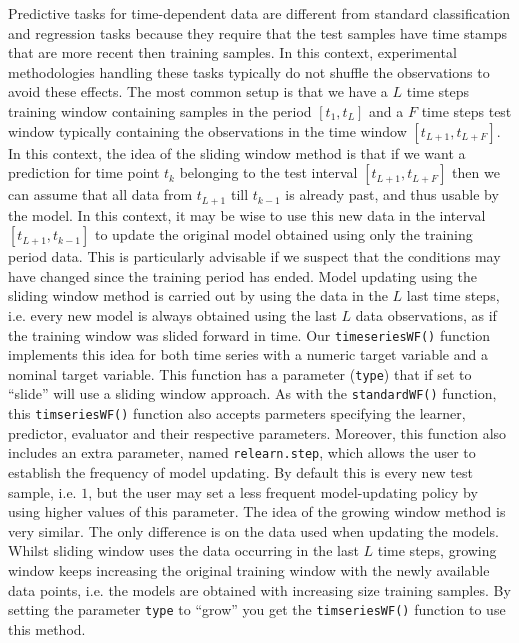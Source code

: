\documentclass[10pt,a4paper]{article}\usepackage[]{graphicx}\usepackage[]{color}
\begin{document}
Predictive tasks for time-dependent data are different from standard
classification and regression tasks because they require that the test
samples have time stamps that are more recent then training
samples. In this context, experimental methodologies handling these
tasks typically do not shuffle the observations to avoid these
effects. The most common setup is that we have a $L$ time steps
training window containing samples in the period $[t_1,t_L]$ and a $F$
time steps test window typically containing the observations in the
time window $[t_{L+1},t_{L+F}]$. In this context, the idea of the
sliding window method is that if we want a prediction for time point
$t_k$ belonging to the test interval $[t_{L+1},t_{L+F}]$ then we can
assume that all data from $t_{L+1}$ till $t_{k-1}$ is already past,
and thus usable by the model. In this context, it may be wise to use
this new data in the interval $[t_{L+1},t_{k-1}]$ to update the
original model obtained using only the training period data. This is
particularly advisable if we suspect that the conditions may have
changed since the training period has ended. Model updating using the
sliding window method is carried out by using the data in the $L$ last
time steps, i.e. every new model is always obtained using the last $L$
data observations, as if the training window was slided forward in
time. Our \texttt{timeseriesWF()} function implements this idea for
both time series with a numeric target variable and a nominal target
variable. This function has a parameter (\texttt{type}) that if set to
``slide'' will use a sliding window approach. As with the
\texttt{standardWF()} function, this \texttt{timseriesWF()} function
also accepts parmeters specifying the learner, predictor, evaluator
and their respective parameters. Moreover, this function also includes
an extra parameter, named \texttt{relearn.step}, which allows the user
to establish the frequency of model updating. By default this is every
new test sample, i.e. $1$, but the user may set a less frequent
model-updating policy by using higher values of this parameter.  The
idea of the growing window method is very similar. The only difference
is on the data used when updating the models. Whilst sliding window
uses the data occurring in the last $L$ time steps, growing window
keeps increasing the original training window with the newly available
data points, i.e. the models are obtained with increasing size
training samples. By setting the parameter \texttt{type} to ``grow''
you get the \texttt{timseriesWF()} function to use this method.
\end{document}
